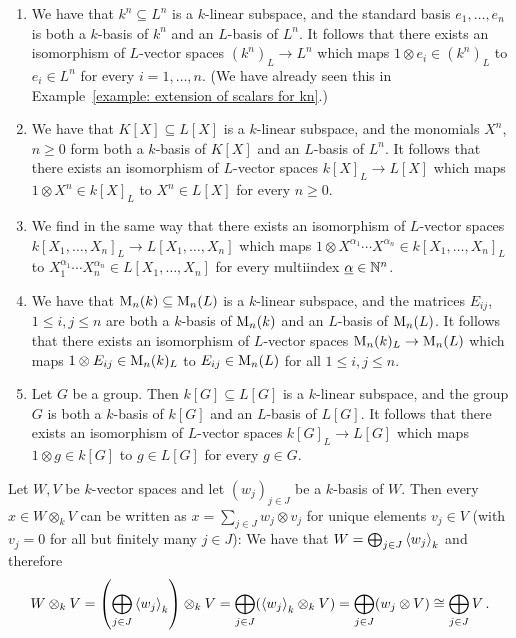 \begin{example}
  \label{example: recognizing extension of scalar}
  \leavevmode
  \begin{enumerate}
    \item
      We have that $k^n \subseteq L^n$ is a $k$-linear subspace, and the standard basis $e_1, \dotsc, e_n$ is both a $k$-basis of $k^n$ and an $L$-basis of $L^n$.
      It follows that there exists an isomorphism of $L$-vector spaces $(k^n)_L \to L^n$ which maps $1 \otimes e_i \in (k^n)_L$ to $e_i \in L^n$ for every $i = 1, \dotsc, n$.
      (We have already seen this in Example~\ref{example: extension of scalars for kn}.)
    \item
      We have that $K[X] \subseteq L[X]$ is a $k$-linear subspace, and the monomials $X^n$, $n \geq 0$ form both a $k$-basis of $K[X]$ and an $L$-basis of $L^n$.
      It follows that there exists an isomorphism of $L$-vector spaces $k[X]_L \to L[X]$ which maps $1 \otimes X^n \in k[X]_L$ to $X^n \in L[X]$ for every $n \geq 0$.
    \item
      We find in the same way that there exists an isomorphism of $L$-vector spaces $k[X_1, \dotsc, X_n]_L \to L[X_1, \dotsc, X_n]$ which maps $1 \otimes X^{\alpha_1} \dotsm X^{\alpha_n} \in k[X_1, \dotsc, X_n]_L$ to $X_1^{\alpha_1} \dotsm X_n^{\alpha_n} \in L[X_1, \dotsc, X_n]$ for every multiindex $\underline{\alpha} \in \mathbb{N}^n$.
    \item
      We have that $\operatorname{M}_n(k) \subseteq \operatorname{M}_n(L)$ is a $k$-linear subspace, and the matrices $E_{ij}$, $1 \leq i,j \leq n$ are both a $k$-basis of $\operatorname{M}_n(k)$ and an $L$-basis of $\operatorname{M}_n(L)$.
      It follows that there exists an isomorphism of $L$-vector spaces $\operatorname{M}_n(k)_L \to \operatorname{M}_n(L)$ which maps $1 \otimes E_{ij} \in \operatorname{M}_n(k)_L$ to $E_{ij} \in \operatorname{M}_n(L)$ for all $1 \leq i,j \leq n$.
    \item
      Let $G$ be a group.
      Then $k[G] \subseteq L[G]$ is a $k$-linear subspace, and the group $G$ is both a $k$-basis of $k[G]$ and an $L$-basis of $L[G]$.
      It follows that there exists an isomorphism of $L$-vector spaces $k[G]_L \to L[G]$ which maps $1 \otimes g \in k[G]$ to $g \in L[G]$ for every $g \in G$.
  \end{enumerate}
\end{example}


\begin{recall}
  Let $W, V$ be $k$-vector spaces and let $(w_j)_{j \in J}$ be a $k$-basis of $W$.
  Then every $x \in W \otimes_k V$ can be written as $x = \sum_{j \in J} w_j \otimes v_j$ for unique elements $v_j \in V$ (with $v_j = 0$ for all but finitely many $j \in J$):
  We have that $W = \bigoplus_{j \in J} \left\langle w_j \right\rangle_k$ and therefore
  \[
          W \otimes_k V
    =     \left( \bigoplus_{j \in J} \left\langle w_j \right\rangle_k \right) \otimes_k V
    =     \bigoplus_{j \in J} ( \left\langle w_j \right\rangle_k \otimes_k V )
    =     \bigoplus_{j \in J} (w_j \otimes V)
    \cong \bigoplus_{j \in J} V \,.
  \]
\end{recall}


